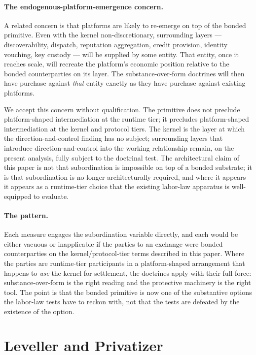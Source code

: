 \documentclass[11pt,a4paper]{article}
\theoremstyle{remark}
\begin{document}
\paragraph{The endogenous-platform-emergence concern.}
A related concern is that platforms are likely to re-emerge on
top of the bonded primitive. Even with the kernel
non-discretionary, surrounding layers --- discoverability, dispatch,
reputation aggregation, credit provision, identity vouching, key
custody --- will be supplied by some entity. That entity, once it
reaches scale, will recreate the platform's economic position
relative to the bonded counterparties on its layer. The
substance-over-form doctrines will then have purchase against
\emph{that} entity exactly as they have purchase against existing
platforms.

We accept this concern without qualification. The primitive does
not preclude platform-shaped intermediation at the runtime tier;
it precludes platform-shaped intermediation at the kernel and
protocol tiers. The kernel is the layer at which the
direction-and-control finding has no subject; surrounding layers
that introduce direction-and-control into the working relationship
remain, on the present analysis, fully subject to the doctrinal
test. The architectural claim of this paper is not that
subordination is impossible on top of a bonded substrate; it is
that subordination is no longer architecturally required, and
where it appears it appears as a runtime-tier choice that the
existing labor-law apparatus is well-equipped to evaluate.

\paragraph{The pattern.}
Each measure engages the subordination variable directly, and each
would be either vacuous or inapplicable if the parties to an
exchange were bonded counterparties on the kernel/protocol-tier
terms described in this paper. Where the parties are runtime-tier
participants in a platform-shaped arrangement that happens to
\emph{use} the kernel for settlement, the doctrines apply with
their full force: substance-over-form is the right reading and
the protective machinery is the right tool. The point is that
the bonded primitive is now one of the substantive options the
labor-law tests have to reckon with, not that the tests are
defeated by the existence of the option.

\section{Leveller and Privatizer}
\label{sec:leveller}
\end{document}
